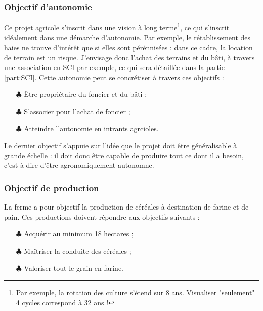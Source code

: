 \documentclass{book}
\begin{document}
\subsubsection{Objectif d'autonomie}

Ce projet agricole s'inscrit dans une vision à long terme\footnote{Par exemple, la rotation des culture s'étend sur 8 ans. Visualiser "seulement" 4 cycles correspond à 32 ans !}, ce qui s'inscrit idéalement dans une démarche d'autonomie. Par exemple, le rétablissement des haies ne trouve d'intérêt que si elles sont pérénnisées : dans ce cadre, la location de terrain est un risque. J'envisage donc l'achat des terrains et du bâti, à travers une association en SCI par exemple, ce qui sera détaillée dans la partie \ref{part:SCI}. Cette autonomie peut se concrétiser à travers ces objectifs :

\hspace{1cm}
\begin{itemize}

	\item[$\clubsuit$] Être propriétaire du foncier et du bâti ; 
	\item[$\clubsuit$] S'associer pour l'achat de foncier ;
	\item[$\clubsuit$] Atteindre l'autonomie en intrants agrcioles.

\end{itemize}
\hspace{1cm}

Le dernier objectif s'appuie sur l'idée que le projet doit être généralisable à grande échelle : il doit donc être capable de produire tout ce dont il a besoin, c'est-à-dire d'être agronomiquement autonomne.

\subsubsection{Objectif de production}

La ferme a pour objectif la production de céréales à destination de farine et de pain. Ces productions doivent répondre aux objectifs suivants :

\hspace{1cm}
\begin{itemize}

	\item[$\clubsuit$] Acquérir au minimum 18 hectares ;
	\item[$\clubsuit$] Maîtriser la conduite des céréales ;
	\item[$\clubsuit$] Valoriser tout le grain en farine.

\end{itemize}
\hspace{1cm}
\end{document}
